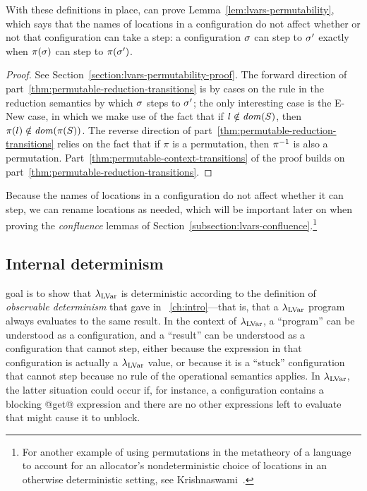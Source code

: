 \LVarsDefPermutationStore

\LVarsDefPermutationConfiguration
\fi

With these definitions in place,  can prove
Lemma~\ref{lem:lvars-permutability}, which says that the names of
locations in a configuration do not affect whether or not that
configuration can take a step: a configuration $\sigma$ can step to
$\sigma'$ exactly when $\pi(\sigma)$ can step to $\pi(\sigma')$.

\LVarsLemPermutability
\ifdefined\DISSERTATION
\begin{proof}
  See Section~\ref{section:lvars-permutability-proof}.  The forward
  direction of part~\ref{thm:permutable-reduction-transitions} is by
  cases on the rule in the reduction semantics by which $\sigma$ steps
  to $\sigma'$; the only interesting case is the {\sc E-New} case, in
  which we make use of the fact that if $l \notin \mathit{dom}(S)$, then
  $\pi(l) \notin \mathit{dom}(\pi(S))$. The reverse direction of
  part~\ref{thm:permutable-reduction-transitions} relies on the fact
  that if $\pi$ is a permutation, then $\pi^{-1}$ is also a permutation.
  Part~\ref{thm:permutable-context-transitions} of the proof builds on
  part~\ref{thm:permutable-reduction-transitions}.
\end{proof}
\fi

\noindent Because the names of locations in a configuration do not affect
whether it can step, we can rename locations as needed, which will be
important later on when proving the \emph{confluence} lemmas of
Section~\ref{subsection:lvars-confluence}.\footnote{For another
  example of using permutations in the metatheory of a language to
  account for an allocator's nondeterministic choice of locations in
  an otherwise deterministic setting, see
  Krishnaswami~.}

\subsection{Internal determinism}

 goal is to show that $\lambda_{\textrm{LVar}}$ is deterministic according to
the definition of \emph{observable determinism} that  gave in
~\ref{ch:intro}---that is, that a $\lambda_{\textrm{LVar}}$ program always
evaluates to the same result.  In the context of $\lambda_{\textrm{LVar}}$, a
``program'' can be understood as a configuration, and a ``result'' can
be understood as a configuration that cannot step, either because the
expression in that configuration is actually a $\lambda_{\textrm{LVar}}$ value, or because it is
a ``stuck'' configuration that cannot step because no rule of the
operational semantics applies.  In $\lambda_{\textrm{LVar}}$, the latter situation
could occur if, for instance, a configuration contains a blocking
@get@ expression and there are no other expressions left to evaluate
that might cause it to unblock.

